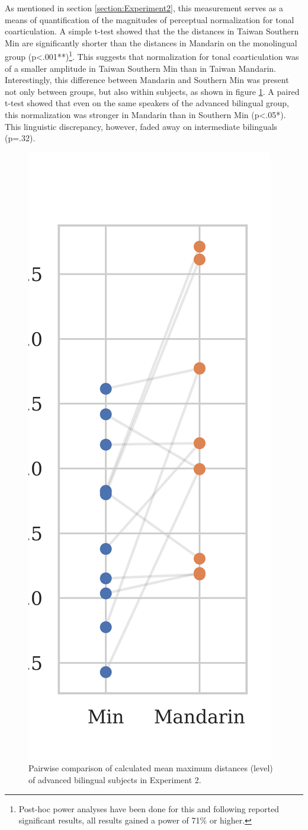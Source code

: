 \documentclass[12pt]{report}
\begin{document}
\begin{CJK}{UTF8}{bsmi}

As mentioned in section \ref{section:Experiment2}, this measurement serves as a means of quantification of the magnitudes of perceptual normalization for tonal coarticulation. A simple t-test showed that the the distances in Taiwan Southern Min are significantly shorter than the distances in Mandarin on the monolingual group (p<.001**)\footnote{Post-hoc power analyses have been done for this and following reported significant results, all results gained a power of 71\% or higher.}. This suggests that normalization for tonal coarticulation was of a smaller amplitude in Taiwan Southern Min than in Taiwan Mandarin. Interestingly, this difference between Mandarin and Southern Min was present not only between groups, but also within subjects, as shown in figure \ref{Figure:DistBilingualBoxPlot}. A paired t-test showed that even on the same speakers of the advanced bilingual group, this normalization was stronger in Mandarin than in Southern Min (p<.05*). This linguistic discrepancy, however, faded away on intermediate bilinguals (p=.32).

\begin{figure}[hbt!]
\centering
\includegraphics[width=.3\textwidth, trim={0 .5cm 0 0}]{Figures/E2/Result_bilingual.png}
\caption{Pairwise comparison of calculated mean maximum distances (level) of advanced bilingual subjects in Experiment 2.}
\label{Figure:DistBilingualBoxPlot}
\end{figure}


\end{CJK}
\end{document}
